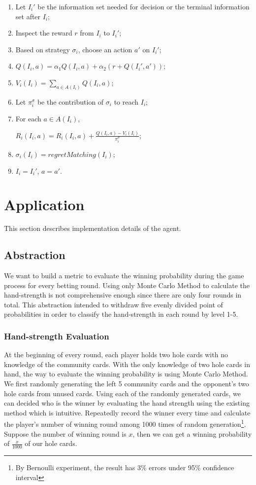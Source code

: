 \documentclass{article}
\begin{document}
\begin{enumerate}
\item Let $I_i'$ be the information set needed for decision or the terminal information set after $I_i$;
\item Inspect the reward $r$ from $I_i$ to $I_i'$;
\item Based on strategy $\sigma_i$, choose an action $a'$ on $I_i'$;
\item $Q(I_i, a) = \alpha_1 Q(I_i, a) + \alpha_2 (r + Q(I_i', a'))$;
\item $V_i(I_i) = \sum_{a \in A(I_i)} Q(I_i, a)$;
\item Let $\pi_i^\sigma$ be the contribution of $\sigma_i$ to reach $I_i$;
\item For each $a \in A(I_i)$,

$R_i(I_i, a) = R_i(I_i, a) + \frac {Q(I_i, a) - V_i(I_i)} {\pi_i^\sigma}$;
\item $\sigma_i(I_i) = regretMatching(I_i)$;
\item $I_i = I_i'$, $a = a'$.
\end{enumerate}

\section{Application}
This section describes implementation details of the agent.
\subsection{Abstraction}

We want to build a metric to evaluate the winning probability during the game process for every betting round. Using only Monte Carlo Method to calculate the hand-strength is not comprehensive enough since there are only four rounds in total. This abstraction intended to withdraw five evenly divided point of probabilities in order to classify the hand-strength in each round by level 1-5.

\subsubsection{Hand-strength Evaluation}


At the beginning of every round, each player holds two hole cards with no knowledge of the community cards. With the only knowledge of two hole cards in hand, the way to evaluate the winning probability is using Monte Carlo Method. We first randomly generating the left 5 community cards and the opponent’s two hole cards from unused cards. Using each of the randomly generated cards, we can decided who is the winner by evaluating the hand strength using the existing method which is intuitive. Repeatedly record the winner every time and calculate the player’s number of winning round among 1000 times of random generation\footnote{By Bernoulli experiment, the result has 3\% errors under 95\% confidence interval}. Suppose the number of winning round is $x$, then we can get a winning probability of $\frac{x}{1000}$ of our hole cards.
\end{document}
